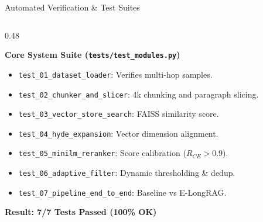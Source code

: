 \documentclass[10pt,aspectratio=169]{beamer}
\begin{document}
\begin{frame}{Automated Verification \& Test Suites}
    \begin{columns}[onlytextwidth,T]
        \begin{column}{0.48\textwidth}
            \begin{block}{\textbf{Core System Suite (\texttt{tests/test\_modules.py})}}
                \scriptsize
                \begin{itemize}\setlength\itemsep{1pt}
                    \item \texttt{test\_01\_dataset\_loader}: Verifies multi-hop samples.
                    \item \texttt{test\_02\_chunker\_and\_slicer}: 4k chunking and paragraph slicing.
                    \item \texttt{test\_03\_vector\_store\_search}: FAISS similarity score.
                    \item \texttt{test\_04\_hyde\_expansion}: Vector dimension alignment.
                    \item \texttt{test\_05\_minilm\_reranker}: Score calibration ($R_{CE} > 0.9$).
                    \item \texttt{test\_06\_adaptive\_filter}: Dynamic thresholding \& dedup.
                    \item \texttt{test\_07\_pipeline\_end\_to\_end}: Baseline vs E-LongRAG.
                \end{itemize}
                \vspace{0.08cm}
                \textcolor{accentgreen}{\textbf{Result: 7/7 Tests Passed (100\% OK)}}
            \end{block}
        \end{column}
        

\end{columns}
\end{frame}
\end{document}
